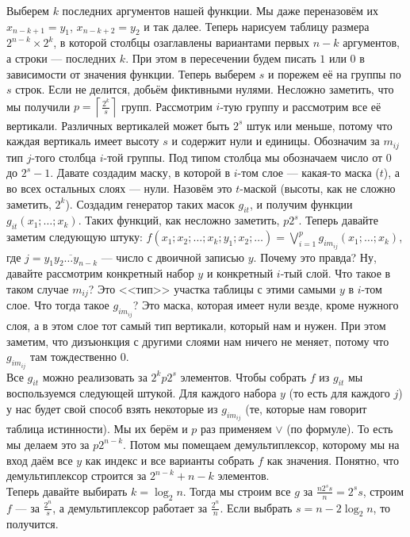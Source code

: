 \documentclass{article}
\begin{document}
\begin{itemize}
\begin{Proof}
            Выберем $k$ последних аргументов нашей функции. Мы даже переназовём их $x_{n-k+1}=y_1$, $x_{n-k+2}=y_2$ и так далее. Теперь нарисуем таблицу размера $2^{n-k}\times2^k$, в которой столбцы озаглавлены вариантами первых $n-k$ аргументов, а строки --- последних $k$. При этом в пересечении будем писать $1$ или $0$ в зависимости от значения функции. Теперь выберем $s$ и порежем её на группы по $s$ строк. Если не делится, добьём фиктивными нулями. Несложно заметить, что мы получили $p=\left\lceil\frac{2^k}s\right\rceil$ групп. Рассмотрим $i$-тую группу и рассмотрим все её вертикали. Различных вертикалей может быть $2^s$ штук или меньше, потому что каждая вертикаль имеет высоту $s$ и содержит нули и единицы. Обозначим за $m_{ij}$ тип $j$-того столбца $i$-той группы. Под типом столбца мы обозначаем число от 0 до $2^s-1$. Давате создадим маску, в которой в $i$-том слое --- какая-то маска ($t$), а во всех остальных слоях --- нули. Назовём это $t$-маской (высоты, как не сложно заметить, $2^k$). Создадим генератор таких масок $g_{it}$, и получим функции $g_{it}(x_1;\ldots;x_k)$. Таких функций, как несложно заметить, $p2^s$. Теперь давайте заметим следующую штуку: $f(x_1;x_2;\ldots;x_k;y_1;x_2;\ldots)=\bigvee\limits_{i=1}^pg_{im_{ij}}(x_1;\ldots;x_k)$, где $j=\overline{y_1y_2\ldots y_{n-k}}$ --- число с двоичной записью $y$. Почему это правда? Ну, давайте рассмотрим конкретный набор $y$ и конкретный $i$-тый слой. Что такое в таком случае $m_{ij}$? Это <<тип>> участка таблицы с этими самыми $y$ в $i$-том слое. Что тогда такое $g_{im_{ij}}$? Это маска, которая имеет нули везде, кроме нужного слоя, а в этом слое тот самый тип вертикали, который нам и нужен. При этом заметим, что дизъюнкция с другими слоями нам ничего не меняет, потому что $g_{im_{ij}}$ там тождественно 0.\\
            Все $g_{it}$ можно реализовать за $2^kp2^s$ элементов. Чтобы собрать $f$ из $g_{it}$ мы воспользуемся следующей штукой. Для каждого набора $y$ (то есть для каждого $j$) у нас будет свой способ взять некоторые из $g_{im_{ij}}$ (те, которые нам говорит таблица истинности). Мы их берём и $p$ раз применяем $\vee$ (по формуле). То есть мы делаем это за $p2^{n-k}$. Потом мы помещаем демультиплексор, которому мы на вход даём все $y$ как индекс и все варианты собрать $f$ как значения. Понятно, что демультиплексор строится за $2^{n-k}+n-k$ элементов.\\
            Теперь давайте выбирать $k=\log_2n$. Тогда мы строим все $g$ за $\frac{n2^ss}n=2^ss$, строим $f$ --- за $\frac{2^n}s$, а демультиплексор работает за $\frac{2^n}n$. Если выбрать $s=n-2\log_2n$, то получится.
        \end{Proof}
    \end{itemize}
\end{document}
